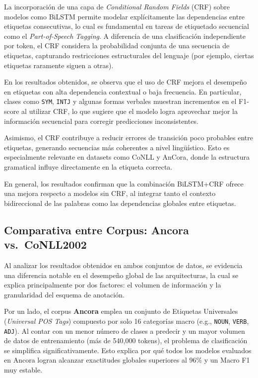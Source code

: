 \documentclass[12pt, a4paper]{article}
\begin{document}
La incorporación de una capa de \textit{Conditional Random Fields} (CRF) sobre modelos como BiLSTM permite modelar explícitamente las dependencias entre etiquetas consecutivas, lo cual es fundamental en tareas de etiquetado secuencial como el \textit{Part-of-Speech Tagging}. A diferencia de una clasificación independiente por token, el CRF considera la probabilidad conjunta de una secuencia de etiquetas, capturando restricciones estructurales del lenguaje (por ejemplo, ciertas etiquetas raramente siguen a otras).

En los resultados obtenidos, se observa que el uso de CRF mejora el desempeño en etiquetas con alta dependencia contextual o baja frecuencia. En particular, clases como \texttt{SYM}, \texttt{INTJ} y algunas formas verbales muestran incrementos en el F1-score al utilizar CRF, lo que sugiere que el modelo logra aprovechar mejor la información secuencial para corregir predicciones inconsistentes.

Asimismo, el CRF contribuye a reducir errores de transición poco probables entre etiquetas, generando secuencias más coherentes a nivel lingüístico. Esto es especialmente relevante en datasets como CoNLL y AnCora, donde la estructura gramatical influye directamente en la etiqueta correcta.

En general, los resultados confirman que la combinación BiLSTM+CRF ofrece una mejora respecto a modelos sin CRF, al integrar tanto el contexto bidireccional de las palabras como las dependencias globales entre etiquetas.

\subsection{Comparativa entre Corpus: Ancora vs.\ CoNLL2002}


Al analizar los resultados obtenidos en ambos conjuntos de datos, se evidencia una diferencia notable en el desempeño global de las arquitecturas, la cual se explica principalmente por dos factores: el volumen de información y la granularidad del esquema de anotación.

Por un lado, el corpus \textbf{Ancora} emplea un conjunto de Etiquetas Universales (\textit{Universal POS Tags}) compuesto por solo 16 categorías macro (e.g., \texttt{NOUN}, \texttt{VERB}, \texttt{ADJ}). Al contar con un menor número de clases a predecir y un mayor volumen de datos de entrenamiento (más de 540,000 tokens), el problema de clasificación se simplifica significativamente. Esto explica por qué todos los modelos evaluados en Ancora logran alcanzar exactitudes globales superiores al 96\% y un Macro F1 muy estable.
\end{document}
